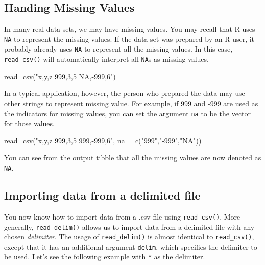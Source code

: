 \documentclass[
]{book}
\newenvironment{Shaded}{\begin{snugshade}}{\end{snugshade}}
\newcommand{\AttributeTok}[1]{\textcolor[rgb]{0.77,0.63,0.00}{#1}}
\newcommand{\FunctionTok}[1]{\textcolor[rgb]{0.00,0.00,0.00}{#1}}
\newcommand{\NormalTok}[1]{#1}
\newcommand{\StringTok}[1]{\textcolor[rgb]{0.31,0.60,0.02}{#1}}
\begin{document}
\hypertarget{handing-missing-values}{%
\subsection{Handing Missing Values}\label{handing-missing-values}}

In many real data sets, we may have missing values. You may recall that R uses \texttt{NA} to represent the missing values. If the data set was prepared by an R user, it probably already uses \texttt{NA} to represent all the missing values. In this case, \texttt{read\_csv()} will automatically interpret all \texttt{NA}s as missing values.

\begin{Shaded}
\begin{Highlighting}[]
\FunctionTok{read\_csv}\NormalTok{(}\StringTok{"x,y,z}
\StringTok{          999,3,5}
\StringTok{         NA,{-}999,6"}\NormalTok{)}
\end{Highlighting}
\end{Shaded}

In a typical application, however, the person who prepared the data may use other strings to represent missing value. For example, if 999 and -999 are used as the indicators for missing values, you can set the argument \texttt{na} to be the vector for those values.

\begin{Shaded}
\begin{Highlighting}[]
\FunctionTok{read\_csv}\NormalTok{(}\StringTok{"x,y,z}
\StringTok{          999,3,5}
\StringTok{         999,{-}999,6"}\NormalTok{, }\AttributeTok{na =} \FunctionTok{c}\NormalTok{(}\StringTok{"999"}\NormalTok{,}\StringTok{"{-}999"}\NormalTok{,}\StringTok{"NA"}\NormalTok{))}
\end{Highlighting}
\end{Shaded}

You can see from the output tibble that all the missing values are now denoted as \texttt{NA}.

\hypertarget{importing-data-from-a-delimited-file}{%
\subsection{Importing data from a delimited file}\label{importing-data-from-a-delimited-file}}

You now know how to import data from a .csv file using \texttt{read\_csv()}. More generally, \texttt{read\_delim()} allows us to import data from a delimited file with any chosen \emph{delimiter}. The usage of \texttt{read\_delim()} is almost identical to \texttt{read\_csv()}, except that it has an additional argument \texttt{delim}, which specifies the delimiter to be used. Let's see the following example with \texttt{*} as the delimiter.
\end{document}
